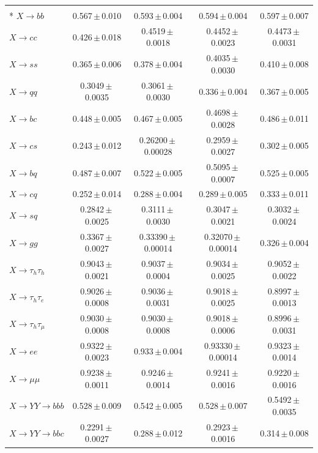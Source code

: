 \documentclass[12pt]{article}   %
\begin{document}
\begin{landscape}
{\begin{longtable}{@{\extracolsep{\fill}}lcccc@{}}
\midrule
\endhead
\bottomrule
\endlastfoot
\multicolumn{5}{@{}l}{\textit{linear probe on the frozen features}} \\*
$X\to bb$ & 0.567\,$\pm$\,0.010 & 0.593\,$\pm$\,0.004 & 0.594\,$\pm$\,0.004 & 0.597\,$\pm$\,0.007 \\
$X\to cc$ & 0.426\,$\pm$\,0.018 & 0.4519\,$\pm$\,0.0018 & 0.4452\,$\pm$\,0.0023 & 0.4473\,$\pm$\,0.0031 \\
$X\to ss$ & 0.365\,$\pm$\,0.006 & 0.378\,$\pm$\,0.004 & 0.4035\,$\pm$\,0.0030 & 0.410\,$\pm$\,0.008 \\
$X\to qq$ & 0.3049\,$\pm$\,0.0035 & 0.3061\,$\pm$\,0.0030 & 0.336\,$\pm$\,0.004 & 0.367\,$\pm$\,0.005 \\
$X\to bc$ & 0.448\,$\pm$\,0.005 & 0.467\,$\pm$\,0.005 & 0.4698\,$\pm$\,0.0028 & 0.486\,$\pm$\,0.011 \\
$X\to cs$ & 0.243\,$\pm$\,0.012 & 0.26200\,$\pm$\,0.00028 & 0.2959\,$\pm$\,0.0027 & 0.302\,$\pm$\,0.005 \\
$X\to bq$ & 0.487\,$\pm$\,0.007 & 0.522\,$\pm$\,0.005 & 0.5095\,$\pm$\,0.0007 & 0.525\,$\pm$\,0.005 \\
$X\to cq$ & 0.252\,$\pm$\,0.014 & 0.288\,$\pm$\,0.004 & 0.289\,$\pm$\,0.005 & 0.333\,$\pm$\,0.011 \\
$X\to sq$ & 0.2842\,$\pm$\,0.0025 & 0.3111\,$\pm$\,0.0030 & 0.3047\,$\pm$\,0.0021 & 0.3032\,$\pm$\,0.0024 \\
$X\to gg$ & 0.3367\,$\pm$\,0.0027 & 0.33390\,$\pm$\,0.00014 & 0.32070\,$\pm$\,0.00014 & 0.326\,$\pm$\,0.004 \\
\midrule
$X\to \tau_h\tau_h$ & 0.9043\,$\pm$\,0.0021 & 0.9037\,$\pm$\,0.0004 & 0.9034\,$\pm$\,0.0025 & 0.9052\,$\pm$\,0.0022 \\
\midrule
$X\to \tau_h\tau_e$ & 0.9026\,$\pm$\,0.0008 & 0.9036\,$\pm$\,0.0031 & 0.9018\,$\pm$\,0.0025 & 0.8997\,$\pm$\,0.0013 \\
$X\to \tau_h\tau_\mu$ & 0.9030\,$\pm$\,0.0008 & 0.9030\,$\pm$\,0.0008 & 0.9018\,$\pm$\,0.0006 & 0.8996\,$\pm$\,0.0031 \\
\midrule
$X\to ee$ & 0.9322\,$\pm$\,0.0023 & 0.933\,$\pm$\,0.004 & 0.93330\,$\pm$\,0.00014 & 0.9323\,$\pm$\,0.0014 \\
$X\to \mu\mu$ & 0.9238\,$\pm$\,0.0011 & 0.9246\,$\pm$\,0.0014 & 0.9241\,$\pm$\,0.0016 & 0.9220\,$\pm$\,0.0016 \\
\midrule
$X\to YY\to bbb$ & 0.528\,$\pm$\,0.009 & 0.542\,$\pm$\,0.005 & 0.528\,$\pm$\,0.007 & 0.5492\,$\pm$\,0.0035 \\
$X\to YY\to bbc$ & 0.2291\,$\pm$\,0.0027 & 0.288\,$\pm$\,0.012 & 0.2923\,$\pm$\,0.0016 & 0.314\,$\pm$\,0.008 \\

\end{longtable}}
\end{landscape}
\end{document}
